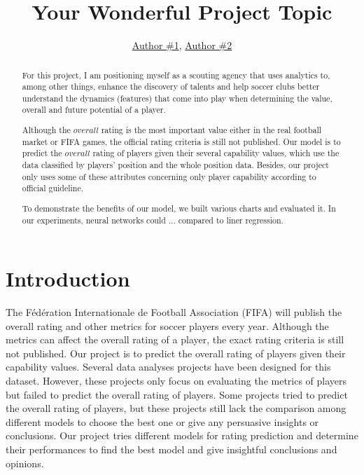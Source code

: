 \documentclass{article}
\title{Your Wonderful Project Topic}
\author{\href{mailto:author1@nyu.edu}{Author \#1}, \href{mailto:author2@nyu.edu}{Author \#2}}
\date{\vspace{-5ex}} %
\begin{document}
\maketitle
\thispagestyle{firstpage}


\begin{abstract}
    
    
    For this project, I am positioning myself as a scouting agency that uses analytics to, among other things, enhance the discovery of talents and help soccer clubs better understand the dynamics (features) that come into play when determining the value, overall and future potential of a player. 
    
    Although the $overall$ rating is the most important value either in the real football market or FIFA games, the official rating criteria is still not published. 
    Our model is to predict the $overall$ rating of players given their several capability values, which use the data classified by players' position and the whole position data.
    Besides, our
    project only uses some of these attributes concerning only player capability according to official guideline.
    
    To demonstrate the benefits of our model, we built various charts and evaluated it. In our experiments, neural networks could ... compared to liner regression.
    
\end{abstract}


\section*{Introduction}
The Fédération Internationale de Football Association (FIFA) will publish the
overall rating and other metrics for soccer players every year. Although the
metrics can affect the overall rating of a player, the exact rating criteria is still
not published. Our project is to predict the overall rating of players given their
capability values.
Several data analyses projects have been designed for this dataset. However,
these projects only focus on evaluating the metrics of players but failed to predict
the overall rating of players. Some projects tried to predict the overall rating
of players, but these projects still lack the comparison among different models
to choose the best one or give any persuasive insights or conclusions. Our project tries different models for rating
prediction and determine their performances to find the best model and give insightful conclusions and opinions.
\end{document}
